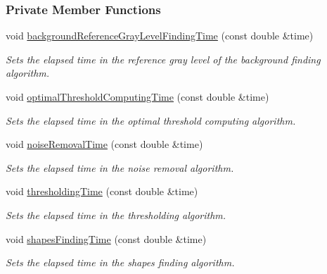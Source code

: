 \subsubsection*{Private Member Functions}
\begin{CompactItemize}
\item 
void \hyperlink{class_statistics_f8a60e8a89be8fe8b2c46782681c1a2c}{backgroundReferenceGrayLevelFindingTime} (const double \&time)
\begin{CompactList}\small\item\em Sets the elapsed time in the reference gray level of the background finding algorithm. \item\end{CompactList}\item 
void \hyperlink{class_statistics_eed35a930f29f4596f3715306e1e1dbc}{optimalThresholdComputingTime} (const double \&time)
\begin{CompactList}\small\item\em Sets the elapsed time in the optimal threshold computing algorithm. \item\end{CompactList}\item 
void \hyperlink{class_statistics_4ad24aec4e5491b7d3afca143e6deb05}{noiseRemovalTime} (const double \&time)
\begin{CompactList}\small\item\em Sets the elapsed time in the noise removal algorithm. \item\end{CompactList}\item 
void \hyperlink{class_statistics_ca6e07bda50783e324e8c51d8c815019}{thresholdingTime} (const double \&time)
\begin{CompactList}\small\item\em Sets the elapsed time in the thresholding algorithm. \item\end{CompactList}\item 
void \hyperlink{class_statistics_bc0a0e96adba6828ffb915a617b58ed2}{shapesFindingTime} (const double \&time)
\begin{CompactList}\small\item\em Sets the elapsed time in the shapes finding algorithm. \item\end{CompactList}\end{CompactItemize}
